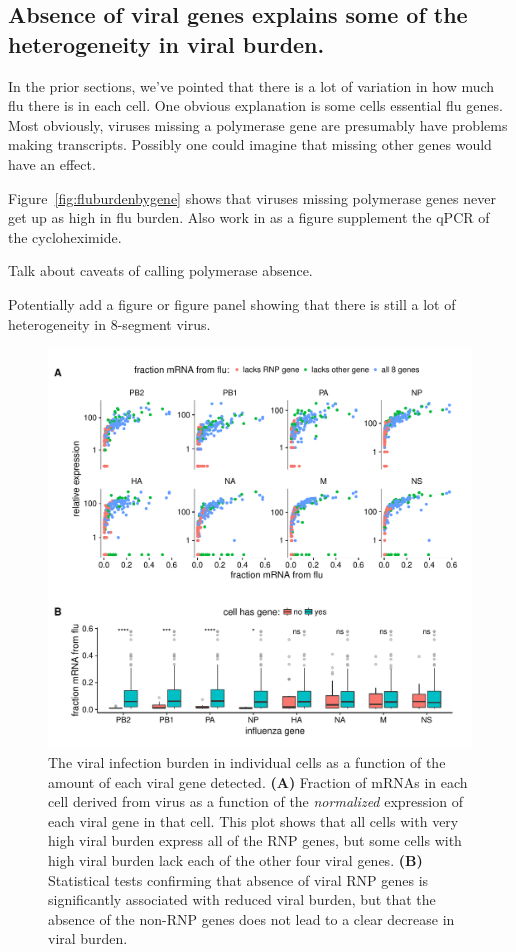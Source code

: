\documentclass[9pt,lineno]{elife}
\begin{document}
\subsection{Absence of viral genes explains some of the heterogeneity in viral burden.}
In the prior sections, we've pointed that there is a lot of variation in how much flu there is in each cell.
One obvious explanation is some cells essential flu genes.
Most obviously, viruses missing a polymerase gene are presumably have problems making transcripts.
Possibly one could imagine that missing other genes would have an effect.

Figure~\ref{fig:fluburdenbygene} shows that viruses missing polymerase genes never get up as high in flu burden.
Also work in as a figure supplement the qPCR of the cycloheximide.

Talk about caveats of calling polymerase absence.

Potentially add a figure or figure panel showing that there is still a lot of heterogeneity in 8-segment virus.

\begin{figure}
\includegraphics[width=\linewidth]{figures/p_flu_burden_flu_gene_merge.pdf}
\caption{
The viral infection burden in individual cells as a function of the amount of each viral gene detected.
{\bf (A)} 
Fraction of mRNAs in each cell derived from virus as a function of the \emph{normalized} expression of each viral gene in that cell.
This plot shows that all cells with very high viral burden express all of the RNP genes, but some cells with high viral burden lack each of the other four viral genes.
{\bf (B)}
Statistical tests confirming that absence of viral RNP genes is significantly associated with reduced viral burden, but that the absence of the non-RNP genes does not lead to a clear decrease in viral burden.
}
\label{fig:fluburdenbyflugene}
\end{figure}
\end{document}
